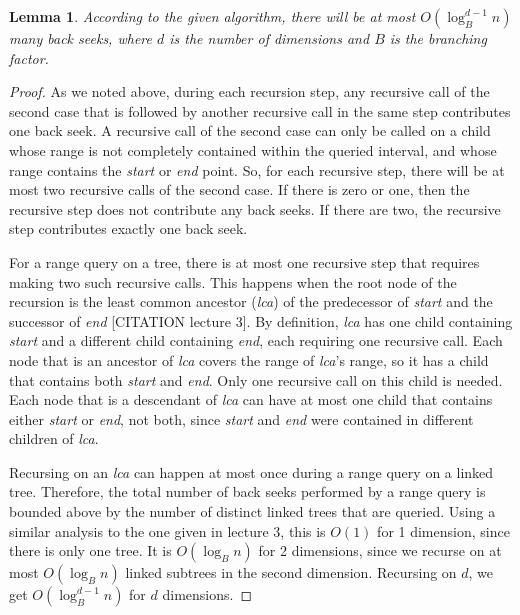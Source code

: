 \documentclass[11pt, oneside]{article}
\newcommand{\ms}{\textit}
\newtheorem*{lemma}{Lemma}
\begin{document}
\begin{lemma}
    According to the given algorithm, there will be at most $O(\log_B^{d-1}n)$
    many back seeks, where $d$ is the number of dimensions and $B$ is the
    branching factor. 
\end{lemma}
\begin{proof}
    As we noted above, during each recursion step, any recursive call of the
    second case that is followed by another recursive call in the same step
    contributes one back seek. A recursive call of the second case can only be
    called on a child whose range is not completely contained within the
    queried interval, and whose range contains the \ms{start} or \ms{end}
    point. So, for each recursive step, there will be at most two recursive
    calls of the second case. If there is zero or one, then the recursive step
    does not contribute any back seeks. If there are two, the recursive step
    contributes exactly one back seek.

    For a range query on a tree, there is at most one recursive step that
    requires making two such recursive calls. This happens when the root node
    of the recursion is the least common ancestor (\ms{lca}) of the predecessor
    of \ms{start} and the successor of \ms{end} [CITATION lecture 3]. By
    definition, \ms{lca} has one child containing \ms{start} and a different
    child containing \ms{end}, each requiring one recursive call. Each node
    that is an ancestor of \ms{lca} covers the range of \ms{lca}'s range, so it
    has a child that contains both \ms{start} and \ms{end}. Only one recursive
    call on this child is needed. Each node that is a descendant of \ms{lca}
    can have at most one child that contains either \ms{start} or \ms{end}, not
    both, since \ms{start} and \ms{end} were contained in different children of
    \ms{lca}. 

    Recursing on an \ms{lca} can happen at most once during a range query on a
    linked tree. Therefore, the total number of back seeks performed by a range
    query is bounded above by the number of distinct linked trees that are
    queried. Using a similar analysis to the one given in lecture 3, this is
    $O(1)$ for 1 dimension, since there is only one tree. It is $O(\log_B n)$
    for 2 dimensions, since we recurse on at most $O(\log_B n)$ linked subtrees
    in the second dimension. Recursing on $d$, we get $O(\log_B^{d-1}n)$ for
    $d$ dimensions.

\end{proof}
\end{document}

